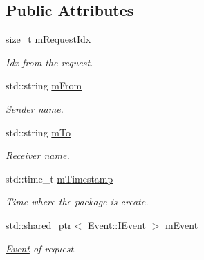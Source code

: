 \subsection*{Public Attributes}
\begin{DoxyCompactItemize}
\item 
\mbox{\label{class_spider_1_1_event_1_1_request_a9fa54e719d09318f76a13abe503feba0}} 
size\+\_\+t \hyperlink{class_spider_1_1_event_1_1_request_a9fa54e719d09318f76a13abe503feba0}{m\+Request\+Idx}
\begin{DoxyCompactList}\small\item\em Idx from the request. \end{DoxyCompactList}\item 
\mbox{\label{class_spider_1_1_event_1_1_request_aaa5e49fc54e2a9523b18788301ce43dc}} 
std\+::string \hyperlink{class_spider_1_1_event_1_1_request_aaa5e49fc54e2a9523b18788301ce43dc}{m\+From}
\begin{DoxyCompactList}\small\item\em Sender name. \end{DoxyCompactList}\item 
\mbox{\label{class_spider_1_1_event_1_1_request_a4077565fee9e0610f706c3e28adfc314}} 
std\+::string \hyperlink{class_spider_1_1_event_1_1_request_a4077565fee9e0610f706c3e28adfc314}{m\+To}
\begin{DoxyCompactList}\small\item\em Receiver name. \end{DoxyCompactList}\item 
\mbox{\label{class_spider_1_1_event_1_1_request_a049065d188d2ece9a873b770c312355c}} 
std\+::time\+\_\+t \hyperlink{class_spider_1_1_event_1_1_request_a049065d188d2ece9a873b770c312355c}{m\+Timestamp}
\begin{DoxyCompactList}\small\item\em Time where the package is create. \end{DoxyCompactList}\item 
\mbox{\label{class_spider_1_1_event_1_1_request_a2d763ea57d53fe6b9cfd6b747fcc920e}} 
std\+::shared\+\_\+ptr$<$ \hyperlink{class_spider_1_1_event_1_1_i_event}{Event\+::\+I\+Event} $>$ \hyperlink{class_spider_1_1_event_1_1_request_a2d763ea57d53fe6b9cfd6b747fcc920e}{m\+Event}
\begin{DoxyCompactList}\small\item\em \hyperlink{namespace_spider_1_1_event}{Event} of request. \end{DoxyCompactList}\end{DoxyCompactItemize}


